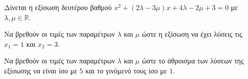 Δίνεται η εξίσωση δευτέρου βαθμού $ x^2+(2\lambda-3\mu)x+4\lambda-2\mu+3=0 $ με $ \lambda,\mu\in\mathbb{R} $.
\begin{rlist}
\item Να βρεθούν οι τιμές των παραμέτρων $ \lambda $ και $ \mu $ ώστε η εξίσωση να έχει λύσεις τις $ x_1=1 $ και $ x_2=3 $.
\item Να βρεθούν οι τιμές των παραμέτρων $ \lambda $ και $ \mu $ ώστε το άθροισμα των λύσεων της εξίσωσης να είναι ίσο με $ 5 $ και το γινόμενό τους ίσο με $ 1 $.
\end{rlist}